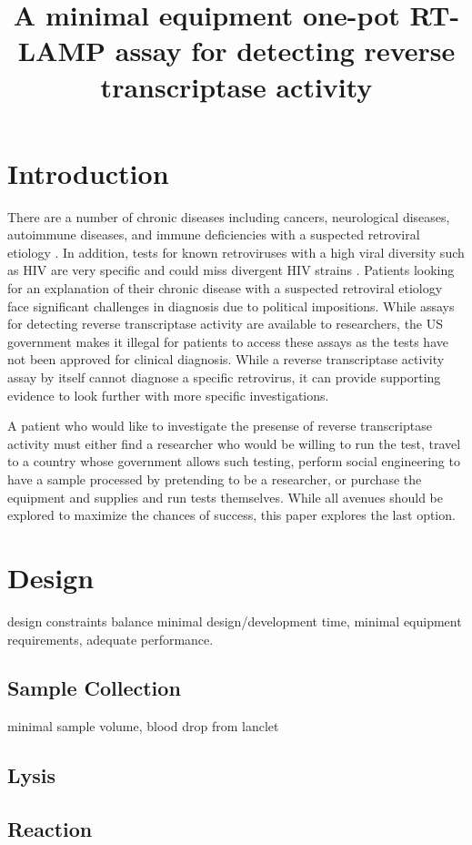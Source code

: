 \documentclass{article}
\title{A minimal equipment one-pot RT-LAMP assay for detecting reverse transcriptase activity}
\begin{document}
\maketitle

\section{Introduction}

There are a number of chronic diseases including cancers, neurological diseases, autoimmune diseases, and immune deficiencies with a suspected retroviral etiology \cite{voisset2008human}. In addition, tests for known retroviruses with a high viral diversity such as HIV are very specific and could miss divergent HIV strains \cite{bartolo2012hiv}\cite{luft2011hiv}. Patients looking for an explanation of their chronic disease with a suspected retroviral etiology face significant challenges in diagnosis due to political impositions. While assays for detecting reverse transcriptase activity are available to researchers, the US government makes it illegal for patients to access these assays as the tests have not been approved for clinical diagnosis. While a reverse transcriptase activity assay by itself cannot diagnose a specific retrovirus, it can provide supporting evidence to look further with more specific investigations.

A patient who would like to investigate the presense of reverse transcriptase activity must either find a researcher who would be willing to run the test, travel to a country whose government allows such testing, perform social engineering to have a sample processed by pretending to be a researcher, or purchase the equipment and supplies and run tests themselves. While all avenues should be explored to maximize the chances of success, this paper explores the last option.


\section{Design}

design constraints balance minimal design/development time, minimal equipment requirements, adequate performance.

\subsection{Sample Collection}

minimal sample volume, blood drop from lanclet 

\subsection{Lysis}

\cite{malmsten2005reverse}

\cite{karamohamed1998bioluminometric}

\cite{curtis2008rapid}

\subsection{Reaction}





\end{document}
